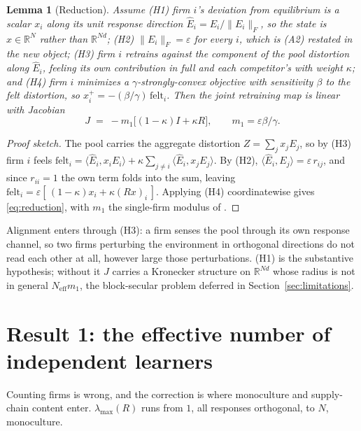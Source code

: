 \documentclass{article}
\theoremstyle{plain}
\newtheorem{lemma}[theorem]{Lemma}
\theoremstyle{definition}
\newcommand{\Neff}{N_{\mathrm{eff}}}
\newcommand{\lmax}{\lambda_{\max}}
\begin{document}
\begin{lemma}[Reduction]
\label{lem:reduction}
Assume \textup{(H1)} firm $i$'s deviation from equilibrium is a scalar $x_i$ along its unit response direction $\hat{E}_i = E_i/\|E_i\|_F$, so the state is $x \in \mathbb{R}^N$ rather than $\mathbb{R}^{Nd}$; \textup{(H2)} $\|E_i\|_F = \varepsilon$ for every $i$, which is \textup{(A2)} restated in the new object; \textup{(H3)} firm $i$ retrains against the component of the pool distortion along $\hat{E}_i$, feeling its own contribution in full and each competitor's with weight $\kappa$; and \textup{(H4)} firm $i$ minimizes a $\gamma$-strongly-convex objective with sensitivity $\beta$ to the felt distortion, so $x_i^{+} = -(\beta/\gamma)\,\mathrm{felt}_i$. Then the joint retraining map is linear with Jacobian
\begin{equation}
\label{eq:reduction}
J \;=\; -m_1\bigl[(1-\kappa)I + \kappa R\bigr], \qquad m_1 = \varepsilon\beta/\gamma .
\end{equation}
\end{lemma}

\begin{proof}[Proof sketch]
The pool carries the aggregate distortion $Z = \sum_j x_j E_j$, so by (H3) firm $i$ feels $\mathrm{felt}_i = \langle \hat{E}_i, x_i E_i\rangle + \kappa\sum_{j\neq i}\langle \hat{E}_i, x_j E_j\rangle$. By (H2), $\langle \hat{E}_i, E_j\rangle = \varepsilon\, r_{ij}$, and since $r_{ii}=1$ the own term folds into the sum, leaving $\mathrm{felt}_i = \varepsilon[\,(1-\kappa)x_i + \kappa (Rx)_i\,]$. Applying (H4) coordinatewise gives \eqref{eq:reduction}, with $m_1$ the single-firm modulus of \citet{perdomo2020}.
\end{proof}

Alignment enters through (H3): a firm senses the pool through its own response channel, so two firms perturbing the environment in orthogonal directions do not read each other at all, however large those perturbations. (H1) is the substantive hypothesis; without it $J$ carries a Kronecker structure on $\mathbb{R}^{Nd}$ whose radius is not in general $\Neff m_1$, the block-secular problem deferred in Section~\ref{sec:limitations}.

\section{Result 1: the effective number of independent learners}
\label{sec:alignment}

Counting firms is wrong, and the correction is where monoculture and supply-chain content enter. $\lmax(R)$ runs from $1$, all responses orthogonal, to $N$, monoculture.
\end{document}
